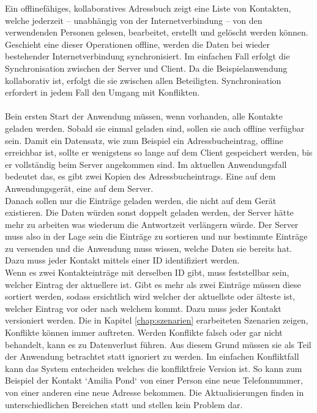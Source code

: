 Ein offlinefähiges, kollaboratives Adressbuch zeigt eine Liste von Kontakten, welche jederzeit -- unabhängig von der Internetverbindung -- von den verwendenden Personen gelesen, bearbeitet, erstellt und gelöscht werden können.
Geschieht eine dieser Operationen offline, werden die Daten bei wieder bestehender Internetverbindung synchronisiert. Im einfachen Fall erfolgt die Synchronisation zwischen der Server und Client. Da die Beispielanwendung kollaborativ ist, erfolgt die sie zwischen allen Beteiligten. Synchronisation erfordert in jedem Fall den Umgang mit Konflikten.\\\\
%
Bein ersten Start der Anwendung müssen, wenn vorhanden, alle Kontakte geladen werden. Sobald sie einmal geladen sind, sollen sie auch offline verfügbar sein.
Damit ein Datensatz, wie zum Beispiel ein Adressbucheintrag, offline erreichbar ist, sollte er wenigstens so lange auf dem Client gespeichert werden, bis er vollständig beim Server angekommen sind. Im aktuellen Anwendungsfall bedeutet das, es gibt zwei Kopien des Adressbucheintrags. Eine auf dem Anwendungsgerät, eine auf dem Server.\\
Danach sollen nur die Einträge geladen werden, die nicht auf dem Gerät existieren.
Die Daten würden sonst doppelt geladen werden, der Server hätte mehr zu arbeiten was wiederum die Antwortzeit verlängern würde.
Der Server muss also in der Lage sein die Einträge zu sortieren und nur bestimmte Einträge zu versenden und die Anwendung muss wissen, welche Daten sie bereits hat. Dazu muss jeder Kontakt mittels einer ID identifiziert werden.\\
Wenn es zwei Kontakteinträge mit derselben ID gibt, muss feststellbar sein, welcher Eintrag der aktuellere ist. Gibt es mehr als zwei Einträge müssen diese sortiert werden, sodass ersichtlich wird welcher der aktuellste oder älteste ist, welcher Eintrag vor oder nach welchem kommt. Dazu muss jeder Kontakt versioniert werden.
%
%
Die in Kapitel \ref{chap:szenarien} erarbeiteten Szenarien zeigen, Konflikte können immer auftreten. Werden Konflikte falsch oder gar nicht behandelt, kann es zu Datenverlust führen.
Aus diesem Grund müssen sie als Teil der Anwendung betrachtet statt ignoriert zu werden.
Im einfachen Konfliktfall kann das System entscheiden welches die konfliktfreie Version ist. So kann zum Beispiel der Kontakt `Amilia Pond` von einer Person eine neue Telefonnummer, von einer anderen eine neue Adresse bekommen.
Die Aktualisierungen finden in unterschiedlichen Bereichen statt und stellen kein Problem dar. \\\\
